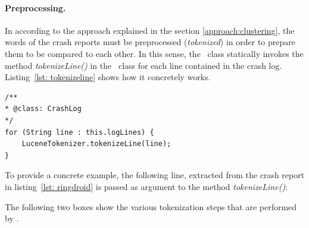 \paragraph{Preprocessing.}
In according to the approach explained in the section \ref{approach:clustering}, the words of the crash reports must be preprocessed (\textit{tokenized}) in order to prepare them to be compared to each other. 
In this sense, the \Crash\ class statically invokes the method \textit{tokenizeLine()} in the \Lucene\ class for each line contained in the crash log. Listing~\ref{lst: tokenizeline} shows how it concretely works. 
\begin{lstlisting}[caption=Each line inside the crash report is tokenized using \Lucene,label={lst: tokenizeline}]
/**
* @class: CrashLog
*/
for (String line : this.logLines) {
	LuceneTokenizer.tokenizeLine(line);
}
\end{lstlisting} 
To provide a concrete example, the following line, extracted from the crash report in listing~\ref{lst: ringdroid} is passed as argument to the method \textit{tokenizeLine()}: \vspace{-0.8cm}
\begin{center}
 \par
\end{center}
The following two boxes show the various tokenization steps that are performed by \toolname.
